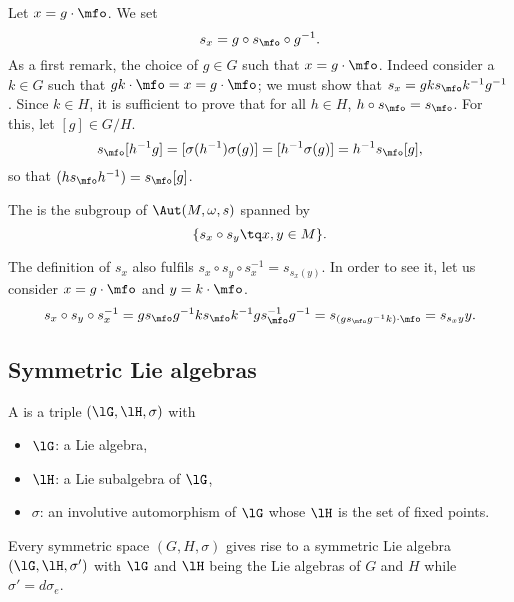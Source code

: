 Let $x=g\cdot\mfo$. We set
\[
   s_x=g\circ s_{\mfo}\circ g^{-1}.
\]
As a first remark, the choice of $g\in G$ such that $x=g\cdot\mfo$. Indeed consider a $k\in G$ such that $gk\cdot\mfo=x=g\cdot\mfo$; we must show that $s_x=gks_{\mfo}k^{-1} g^{-1}$. Since $k\in H$, it is sufficient to prove that for all $h\in H$, $h\circ s_{\mfo}=s_{\mfo}$. For this, let $[g]\in G/H$.
\begin{equation}
s_{\mfo}[h^{-1} g]=[\sigma(h^{-1})\sigma(g)]
    =[h^{-1} \sigma(g)]
    =h^{-1} s_{\mfo}[g],
\end{equation}
so that $(hs_{\mfo}h^{-1})=s_{\mfo}[g]$.

The  is the subgroup of $\Aut(M,\omega,s)$ spanned by 
\[ 
  \{ s_x\circ s_y\tq x,y\in M \}.
\]

The definition of $s_x$ also fulfils $s_x\circ s_y\circ s_x^{-1}=s_{  s_x(y)  }$. In order to see it, let us consider $x=g\cdot\mfo$ and $y=k\cdot\mfo$.
\begin{equation}
s_x\circ s_y\circ s_x^{-1}=g s_{\mfo}g^{-1} ks_{\mfo}k^{-1} gs_{\mfo}^{-1} g^{-1}
                 =s_{ (gs_{\mfo}g^{-1} k)\cdot\mfo }
                 =s_{s_xy}y.
\end{equation}
  

\subsection{Symmetric Lie algebras}

A  is a triple $(\lG,\lH,\sigma)$ with

\begin{itemize}
\item $\lG$: a Lie algebra,
\item $\lH$: a Lie subalgebra of $\lG$,
\item $\sigma$: an involutive automorphism of $\lG$ whose $\lH$ is the set of fixed points.
\end{itemize}

\begin{proposition}
Every symmetric space $(G,H,\sigma)$ gives rise to a symmetric Lie algebra $(\lG,\lH,\sigma')$ with $\lG$ and $\lH$ being the Lie algebras of $G$ and $H$ while $\sigma'=d\sigma_e$.
\end{proposition}

